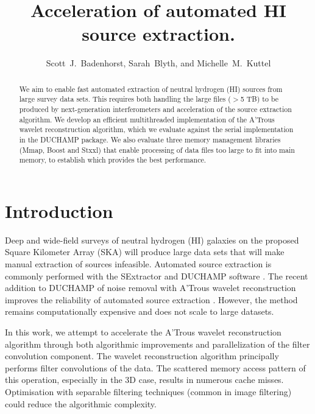 \documentclass[11pt, twoside]{article}
\begin{document}

\title{Acceleration of automated HI source extraction.} 

\author{Scott~J.~Badenhorst, Sarah~Blyth, and Michelle~M.~Kuttel
}


\begin{abstract}
We aim to enable fast automated extraction of neutral hydrogen (HI)  sources from large survey data sets. 
This requires both handling the large files ($>$5 TB) to be produced by next-generation interferometers and acceleration of  the source extraction algorithm. 
We develop an efficient multithreaded implementation of the A'Trous wavelet reconstruction algorithm, which we evaluate against the serial implementation in the DUCHAMP package.  We also evaluate three memory management libraries (Mmap, Boost and Stxxl) that enable processing of data files too large to fit into main memory, to establish which provides the best performance. 
\end{abstract}




\section{Introduction}

Deep and wide-field surveys of neutral hydrogen (HI) galaxies on the proposed Square Kilometer Array (SKA) will produce 
large data sets that will make manual extraction of sources infeasible.  Automated source extraction is commonly performed with the SExtractor \citep{Bertin1996} and DUCHAMP software \citep{Whiting2012}.  
 The recent addition to DUCHAMP of  noise removal with A'Trous wavelet reconstruction \citep{West2010} improves the reliability of automated source extraction \citep{Popping2012, Whiting2012}.  
However, the method remains computationally expensive and does not scale to large datasets.  

In this work, we attempt to accelerate the A'Trous wavelet reconstruction algorithm through both algorithmic improvements and parallelization of the filter convolution component. 
The wavelet reconstruction algorithm  principally performs filter convolutions of the data. The scattered memory access pattern of this operation, especially in the 3D case, results in numerous cache misses.  Optimisation with separable filtering techniques (common in image filtering) could reduce the algorithmic complexity. 
\end{document}
